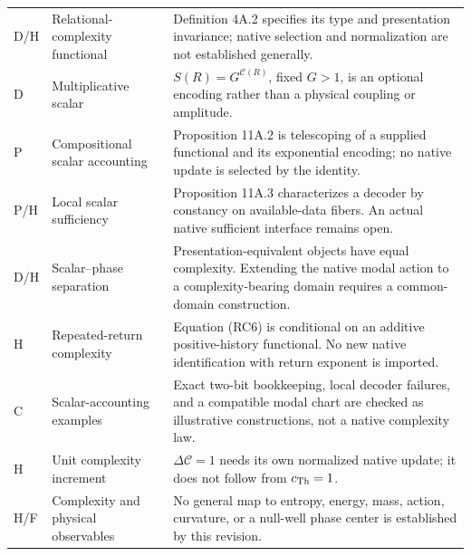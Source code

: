 \begin{longtable}{@{}p{}p{}p{}@{}}
D/H & Relational-complexity functional & Definition 4A.2 specifies its type and presentation invariance; native selection and normalization are not established generally. \\
D & Multiplicative scalar & $S(R)=G^{\mathcal C(R)}$, fixed $G>1$, is an optional encoding rather than a physical coupling or amplitude. \\
P & Compositional scalar accounting & Proposition 11A.2 is telescoping of a supplied functional and its exponential encoding; no native update is selected by the identity. \\
P/H & Local scalar sufficiency & Proposition 11A.3 characterizes a decoder by constancy on available-data fibers. An actual native sufficient interface remains open. \\
D/H & Scalar--phase separation & Presentation-equivalent objects have equal complexity. Extending the native modal action to a complexity-bearing domain requires a common-domain construction. \\
H & Repeated-return complexity & Equation (RC6) is conditional on an additive positive-history functional. No new native identification with return exponent is imported. \\
C & Scalar-accounting examples & Exact two-bit bookkeeping, local decoder failures, and a compatible modal chart are checked as illustrative constructions, not a native complexity law. \\
H & Unit complexity increment & $\Delta\mathcal C=1$ needs its own normalized native update; it does not follow from $c_{\mathrm{Th}}=1$. \\
H/F & Complexity and physical observables & No general map to entropy, energy, mass, action, curvature, or a null-well phase center is established by this revision. \\


\end{longtable}
